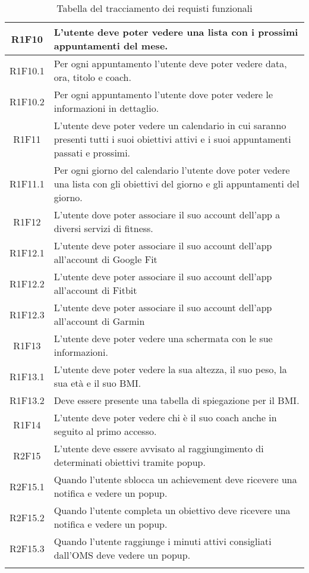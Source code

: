 \begin{longtable}{| c | C{10cm}|}
R1F10 & L’utente deve poter vedere una lista con i prossimi appuntamenti del mese. \\\hline
R1F10.1 & Per ogni appuntamento l’utente deve poter vedere data, ora, titolo e coach. \\\hline
R1F10.2 & Per ogni appuntamento l’utente dove poter vedere le informazioni in dettaglio. \\\hline
R1F11 & L’utente deve poter vedere un calendario in cui saranno presenti tutti i suoi obiettivi attivi e i suoi appuntamenti passati e prossimi.\\\hline
R1F11.1 & Per ogni giorno del calendario l’utente dove poter vedere una lista con gli obiettivi del giorno e gli appuntamenti del giorno.\\\hline
R1F12 & L’utente dove poter associare il suo account dell’app a diversi servizi di fitness. \\\hline
R1F12.1 & L'utente deve poter associare il suo account dell'app all'account di Google Fit \\\hline
R1F12.2 & L'utente deve poter associare il suo account dell'app all'account di Fitbit \\\hline
R1F12.3 & L'utente deve poter associare il suo account dell'app all'account di Garmin \\\hline
R1F13 & L’utente deve poter vedere una schermata con le sue informazioni. \\\hline
R1F13.1 & L’utente deve poter vedere la sua altezza, il suo peso, la sua età e il suo \gls{BMI}. \\\hline
R1F13.2 & Deve essere presente una tabella di spiegazione per il \gls{BMI}. \\\hline
R1F14 & L’utente deve poter vedere chi è il suo coach anche in seguito al primo accesso. \\\hline
R2F15 & L'utente deve essere avvisato al raggiungimento di determinati obiettivi tramite popup. \\\hline
R2F15.1 & Quando l'utente sblocca un achievement deve ricevere una notifica e vedere un popup.\\\hline
R2F15.2 & Quando l'utente completa un obiettivo deve ricevere una notifica e vedere un popup. \\\hline
R2F15.3 & Quando l'utente raggiunge i minuti attivi consigliati dall'OMS deve vedere un popup. \\\hline

\caption{Tabella del tracciamento dei requisti funzionali}
\end{longtable}

